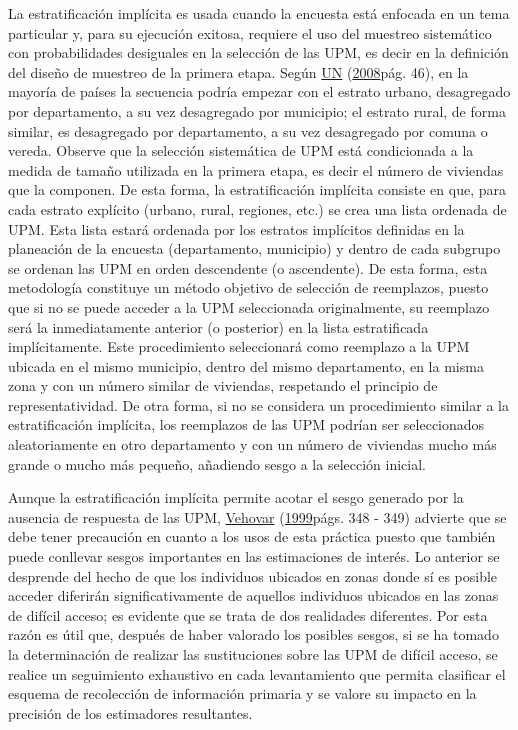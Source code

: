 \documentclass[
  12pt,
  spanish,
]{book}
\begin{document}
La estratificación implícita es usada cuando la encuesta está enfocada en un tema particular y, para su ejecución exitosa, requiere el uso del muestreo sistemático con probabilidades desiguales en la selección de las UPM, es decir en la definición del diseño de muestreo de la primera etapa. Según \protect\hyperlink{ref-United_Nations_2008}{UN} (\protect\hyperlink{ref-United_Nations_2008}{2008}pág. 46), en la mayoría de países la secuencia podría empezar con el estrato urbano, desagregado por departamento, a su vez desagregado por municipio; el estrato rural, de forma similar, es desagregado por departamento, a su vez desagregado por comuna o vereda. Observe que la selección sistemática de UPM está condicionada a la medida de tamaño utilizada en la primera etapa, es decir el número de viviendas que la componen. De esta forma, la estratificación implícita consiste en que, para cada estrato explícito (urbano, rural, regiones, etc.) se crea una lista ordenada de UPM. Esta lista estará ordenada por los estratos implícitos definidas en la planeación de la encuesta (departamento, municipio) y dentro de cada subgrupo se ordenan las UPM en orden descendente (o ascendente). De esta forma, esta metodología constituye un método objetivo de selección de reemplazos, puesto que si no se puede acceder a la UPM seleccionada originalmente, su reemplazo será la inmediatamente anterior (o posterior) en la lista estratificada implícitamente. Este procedimiento seleccionará como reemplazo a la UPM ubicada en el mismo municipio, dentro del mismo departamento, en la misma zona y con un número similar de viviendas, respetando el principio de representatividad. De otra forma, si no se considera un procedimiento similar a la estratificación implícita, los reemplazos de las UPM podrían ser seleccionados aleatoriamente en otro departamento y con un número de viviendas mucho más grande o mucho más pequeño, añadiendo sesgo a la selección inicial.

Aunque la estratificación implícita permite acotar el sesgo generado por la ausencia de respuesta de las UPM, \protect\hyperlink{ref-Vehovar_1999}{Vehovar} (\protect\hyperlink{ref-Vehovar_1999}{1999}págs. 348 - 349) advierte que se debe tener precaución en cuanto a los usos de esta práctica puesto que también puede conllevar sesgos importantes en las estimaciones de interés. Lo anterior se desprende del hecho de que los individuos ubicados en zonas donde sí es posible acceder diferirán significativamente de aquellos individuos ubicados en las zonas de difícil acceso; es evidente que se trata de dos realidades diferentes. Por esta razón es útil que, después de haber valorado los posibles sesgos, si se ha tomado la determinación de realizar las sustituciones sobre las UPM de difícil acceso, se realice un seguimiento exhaustivo en cada levantamiento que permita clasificar el esquema de recolección de información primaria y se valore su impacto en la precisión de los estimadores resultantes.
\end{document}
